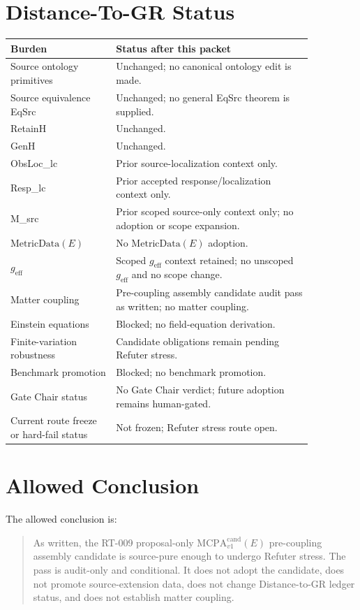\documentclass[11pt]{article}
\newcommand{\MetricData}{\mathrm{MetricData}}
\newcommand{\geff}{g_{\mathrm{eff}}}
\newcommand{\MCPACand}{\mathrm{MCPA}^{\mathrm{cand}}_{v1}}
\begin{document}
\section{Distance-To-GR Status}

\begin{longtable}{p{0.30\linewidth}p{0.56\linewidth}}
\toprule
Burden & Status after this packet \\
\midrule
Source ontology primitives & Unchanged; no canonical ontology edit is made. \\
Source equivalence EqSrc & Unchanged; no general EqSrc theorem is supplied. \\
RetainH & Unchanged. \\
GenH & Unchanged. \\
ObsLoc\_lc & Prior source-localization context only. \\
Resp\_lc & Prior accepted response/localization context only. \\
M\_src & Prior scoped source-only context only; no adoption or scope expansion. \\
\(\MetricData(E)\) & No \(\MetricData(E)\) adoption. \\
\(\geff\) & Scoped \(\geff\) context retained; no unscoped \(\geff\) and no scope change. \\
Matter coupling & Pre-coupling assembly candidate audit pass as written; no matter coupling. \\
Einstein equations & Blocked; no field-equation derivation. \\
Finite-variation robustness & Candidate obligations remain pending Refuter stress. \\
Benchmark promotion & Blocked; no benchmark promotion. \\
Gate Chair status & No Gate Chair verdict; future adoption remains human-gated. \\
Current route freeze or hard-fail status & Not frozen; Refuter stress route open. \\
\bottomrule
\end{longtable}

\section{Allowed Conclusion}

The allowed conclusion is:

\begin{quote}
As written, the RT-009 proposal-only \(\MCPACand(E)\) pre-coupling assembly
candidate is source-pure enough to undergo Refuter stress. The pass is
audit-only and conditional. It does not adopt the candidate, does not promote
source-extension data, does not change Distance-to-GR ledger status, and does
not establish matter coupling.
\end{quote}
\end{document}
